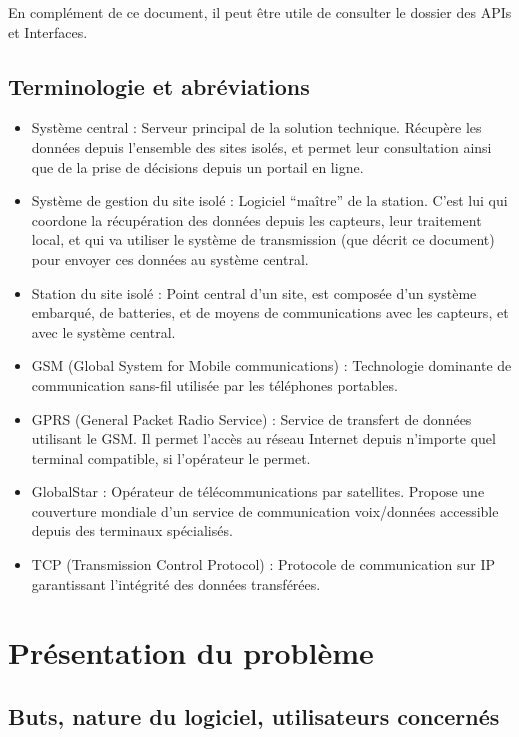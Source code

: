 En complément de ce document, il peut être utile de consulter le dossier des APIs et Interfaces.

\subsection{Terminologie et abréviations}

\begin{itemize}
\item Système central : Serveur principal de la solution technique. Récupère les données depuis l'ensemble des sites isolés, et permet leur consultation ainsi que de la prise de décisions depuis un portail en ligne.
\item Système de gestion du site isolé : Logiciel ``maître'' de la station. C'est lui qui coordone la récupération des données depuis les capteurs, leur traitement local, et qui va utiliser le système de transmission (que décrit ce document) pour envoyer ces données au système central.
\item Station du site isolé : Point central d'un site, est composée d'un système embarqué, de batteries, et de moyens de communications avec les capteurs, et avec le système central.
\end{itemize}

\begin{itemize}
\item GSM (Global System for Mobile communications) : Technologie dominante de communication sans-fil utilisée par les téléphones portables. 
\item GPRS (General Packet Radio Service) : Service de transfert de données utilisant le GSM. Il permet l'accès au réseau Internet depuis n'importe quel terminal compatible, si l'opérateur le permet.
\item GlobalStar : Opérateur de télécommunications par satellites. Propose une couverture mondiale d'un service de communication voix/données accessible depuis des terminaux spécialisés.
\item TCP (Transmission Control Protocol) : Protocole de communication sur IP garantissant l'intégrité des données transférées.
\end{itemize}

\section{Présentation du problème}

\subsection{Buts, nature du logiciel, utilisateurs concernés}

